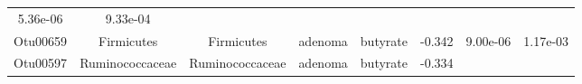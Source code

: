 \documentclass[11pt,]{article}
\begin{document}
\begin{longtable}[]{@{}cccccccc@{}}
\begin{minipage}[t]{0.08\columnwidth}
5.36e-06\strut
\end{minipage} & \begin{minipage}[t]{0.08\columnwidth}\centering\strut
9.33e-04\strut
\end{minipage}\tabularnewline
\begin{minipage}[t]{0.08\columnwidth}\centering\strut
Otu00659\strut
\end{minipage} & \begin{minipage}[t]{0.15\columnwidth}\centering\strut
Firmicutes\strut
\end{minipage} & \begin{minipage}[t]{0.15\columnwidth}\centering\strut
Firmicutes\strut
\end{minipage} & \begin{minipage}[t]{0.08\columnwidth}\centering\strut
adenoma\strut
\end{minipage} & \begin{minipage}[t]{0.09\columnwidth}\centering\strut
butyrate\strut
\end{minipage} & \begin{minipage}[t]{0.07\columnwidth}\centering\strut
-0.342\strut
\end{minipage} & \begin{minipage}[t]{0.08\columnwidth}\centering\strut
9.00e-06\strut
\end{minipage} & \begin{minipage}[t]{0.08\columnwidth}\centering\strut
1.17e-03\strut
\end{minipage}\tabularnewline
\begin{minipage}[t]{0.08\columnwidth}\centering\strut
Otu00597\strut
\end{minipage} & \begin{minipage}[t]{0.15\columnwidth}\centering\strut
Ruminococcaceae\strut
\end{minipage} & \begin{minipage}[t]{0.15\columnwidth}\centering\strut
Ruminococcaceae\strut
\end{minipage} & \begin{minipage}[t]{0.08\columnwidth}\centering\strut
adenoma\strut
\end{minipage} & \begin{minipage}[t]{0.09\columnwidth}\centering\strut
butyrate\strut
\end{minipage} & \begin{minipage}[t]{0.07\columnwidth}\centering\strut
-0.334\strut
\end{minipage} & \begin{minipage}[t]{0.08\columnwidth}\centering\strut

\end{minipage}
\end{longtable}
\end{document}
